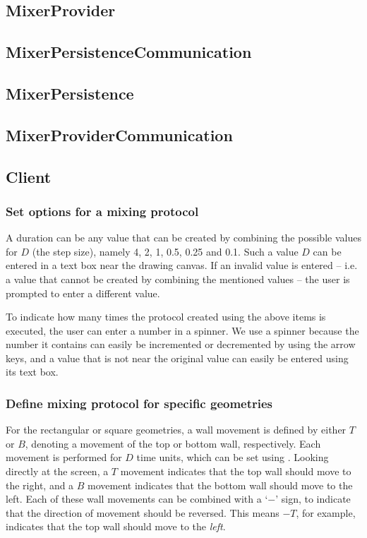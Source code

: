 \subsection{MixerProvider}

\subsection{MixerPersistenceCommunication}

\subsection{MixerPersistence}

\subsection{MixerProviderCommunication}

\subsection{Client}
\subsubsection{Set options for a mixing protocol}
A duration can be any value that can be created by combining the possible values for $D$ (the step size), namely 4, 2, 1, 0.5, 0.25 and 0.1. Such a value $D$ can be entered in a text box near the drawing canvas. If an invalid value is entered -- i.e. a value that cannot be created by combining the mentioned values -- the user is prompted to enter a different value.

To indicate how many times the protocol created using the above items is executed, the user can enter a number in a spinner. We use a spinner because the number it contains can easily be incremented or decremented by using the arrow keys, and a value that is not near the original value can easily be entered using its text box.



\subsubsection{Define mixing protocol for specific geometries}
For the rectangular or square geometries, a wall movement is defined by either $T$ or $B$, denoting a movement of the top or bottom wall, respectively. Each movement is performed for $D$ time units, which can be set using . Looking directly at the screen, a $T$ movement indicates that the top wall should move to the right, and a $B$ movement indicates that the bottom wall should move to the left. Each of these wall movements can be combined with a `$-$' sign, to indicate that the direction of movement should be reversed. This means $-T$, for example, indicates that the top wall should move to the \emph{left}.

